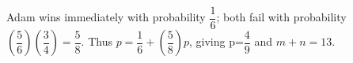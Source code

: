 Adam wins immediately with probability $\dfrac{1}{6}$; both fail with probability $(\dfrac{5}{6})(\dfrac{3}{4})=\dfrac{5}{8}$. Thus $p=\dfrac{1}{6}+(\dfrac{5}{8})p$, giving p=$\dfrac{4}{9}$ and $m+n=\boxed{13}$.
